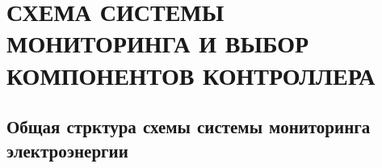 \chapter{СХЕМА СИСТЕМЫ МОНИТОРИНГА И ВЫБОР КОМПОНЕНТОВ КОНТРОЛЛЕРА}

\section{Общая стрктура схемы системы мониторинга электроэнергии}


